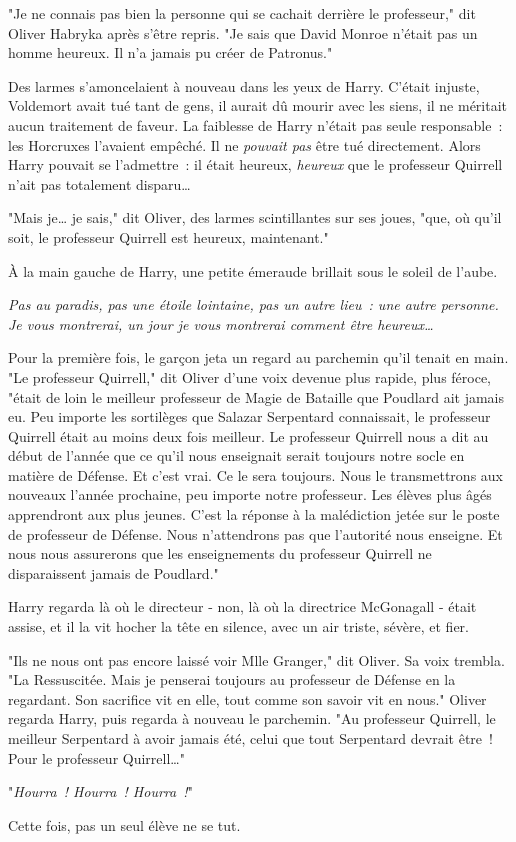 "Je ne connais pas bien la personne qui se cachait derrière le professeur," dit Oliver Habryka après s'être repris. "Je sais que David Monroe n'était pas un homme heureux. Il n'a jamais pu créer de Patronus."

Des larmes s'amoncelaient à nouveau dans les yeux de Harry. C'était injuste, Voldemort avait tué tant de gens, il aurait dû mourir avec les siens, il ne méritait aucun traitement de faveur. La faiblesse de Harry n'était pas seule responsable~: les Horcruxes l'avaient empêché. Il ne \emph{pouvait pas} être tué directement. Alors Harry pouvait se l'admettre~: il était heureux, \emph{heureux} que le professeur Quirrell n'ait pas totalement disparu…

"Mais je… je sais," dit Oliver, des larmes scintillantes sur ses joues, "que, où qu'il soit, le professeur Quirrell est heureux, maintenant."

À la main gauche de Harry, une petite émeraude brillait sous le soleil de l'aube.

\emph{Pas au paradis, pas une étoile lointaine, pas un autre lieu~: une autre personne. Je vous montrerai, un jour je vous montrerai comment être heureux…}

Pour la première fois, le garçon jeta un regard au parchemin qu'il tenait en main. "Le professeur Quirrell," dit Oliver d'une voix devenue plus rapide, plus féroce, "était de loin le meilleur professeur de Magie de Bataille que Poudlard ait jamais eu. Peu importe les sortilèges que Salazar Serpentard connaissait, le professeur Quirrell était au moins deux fois meilleur. Le professeur Quirrell nous a dit au début de l'année que ce qu'il nous enseignait serait toujours notre socle en matière de Défense. Et c'est vrai. Ce le sera toujours. Nous le transmettrons aux nouveaux l'année prochaine, peu importe notre professeur. Les élèves plus âgés apprendront aux plus jeunes. C'est la réponse à la malédiction jetée sur le poste de professeur de Défense. Nous n'attendrons pas que l'autorité nous enseigne. Et nous nous assurerons que les enseignements du professeur Quirrell ne disparaissent jamais de Poudlard."

Harry regarda là où le directeur - non, là où la directrice McGonagall - était assise, et il la vit hocher la tête en silence, avec un air triste, sévère, et fier.

"Ils ne nous ont pas encore laissé voir Mlle Granger," dit Oliver. Sa voix trembla. "La Ressuscitée. Mais je penserai toujours au professeur de Défense en la regardant. Son sacrifice vit en elle, tout comme son savoir vit en nous." Oliver regarda Harry, puis regarda à nouveau le parchemin. "Au professeur Quirrell, le meilleur Serpentard à avoir jamais été, celui que tout Serpentard devrait être~! Pour le professeur Quirrell…"

"\emph{Hourra~! Hourra~! Hourra~!}"

Cette fois, pas un seul élève ne se tut. 

